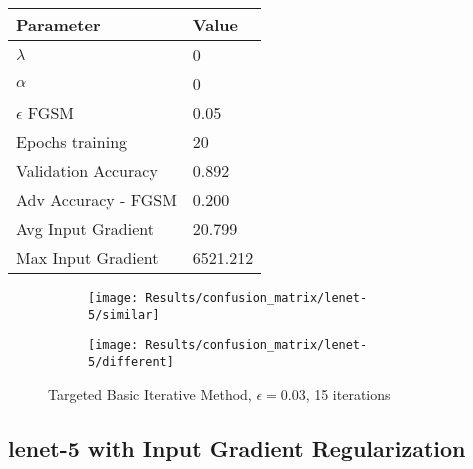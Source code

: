 \documentclass[draft,final]{vutinfth} %
\begin{document}
\begin{table}[h]
  \centering
  \begin{tabular}{ll}
    \toprule
			Parameter			& Value   \\
    \midrule
			$\lambda$								& 0				\\
			$\alpha$								& 0				\\
			$\epsilon$ FGSM					& 0.05		\\
			Epochs training					& 20			\\
			
			Validation Accuracy			& 0.892		\\ 
			Adv Accuracy - FGSM			& 0.200		\\
			
			Avg Input Gradient			& 20.799	\\
			Max Input Gradient			& 6521.212\\
    \bottomrule
  \end{tabular}
\end{table}


\begin{figure}[h]
  \begin{subfigure}[b]{0.5\columnwidth}
		\centering
    \texttt{[image: Results/confusion\_matrix/lenet-5/similar]}
    \label{fig:exp:cm:lenet-5:similar}
  \end{subfigure}
  \begin{subfigure}[b]{0.5\columnwidth}
		\centering
    \texttt{[image: Results/confusion\_matrix/lenet-5/different]}
    \label{fig:exp:cm:lenet-5:different}
  \end{subfigure}
  \caption{Targeted Basic Iterative Method, $\epsilon = 0.03$, 15 iterations}
  \label{fig:exp:cm:lenet-5}
\end{figure}
\clearpage

\subsection{lenet-5 with Input Gradient Regularization}
\end{document}
